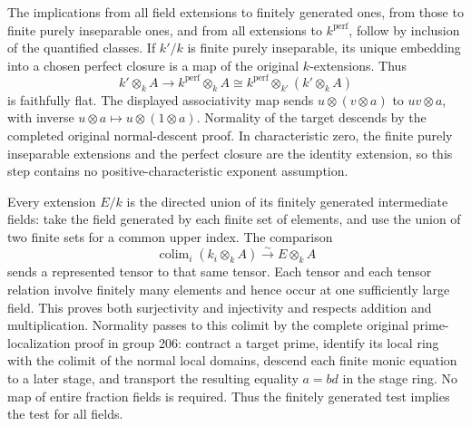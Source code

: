 The implications from all field extensions to finitely generated ones, from those to finite purely inseparable ones, and from all extensions to \(k^{\mathrm{perf}}\), follow by inclusion of the quantified classes. If \(k'/k\) is finite purely inseparable, its unique embedding into a chosen perfect closure is a map of the original \(k\)-extensions. Thus \[
 k'\otimes_kA\longrightarrow k^{\mathrm{perf}}\otimes_kA
 \cong k^{\mathrm{perf}}\otimes_{k'}(k'\otimes_kA)
\] is faithfully flat. The displayed associativity map sends \(u\otimes(v\otimes a)\) to \(uv\otimes a\), with inverse \(u\otimes a\mapsto u\otimes(1\otimes a)\). Normality of the target descends by the completed original normal-descent proof. In characteristic zero, the finite purely inseparable extensions and the perfect closure are the identity extension, so this step contains no positive-characteristic exponent assumption.

Every extension \(E/k\) is the directed union of its finitely generated intermediate fields: take the field generated by each finite set of elements, and use the union of two finite sets for a common upper index. The comparison \[
 \operatorname{colim}_i(k_i\otimes_kA)\xrightarrow{\sim}E\otimes_kA
\] sends a represented tensor to that same tensor. Each tensor and each tensor relation involve finitely many elements and hence occur at one sufficiently large field. This proves both surjectivity and injectivity and respects addition and multiplication. Normality passes to this colimit by the complete original prime-localization proof in group 206: contract a target prime, identify its local ring with the colimit of the normal local domains, descend each finite monic equation to a later stage, and transport the resulting equality \(a=bd\) in the stage ring. No map of entire fraction fields is required. Thus the finitely generated test implies the test for all fields.


